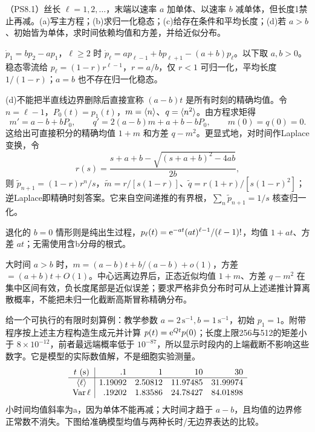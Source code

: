 \begin{exercise}
（PS8.1）丝长 $\ell=1,2,\ldots$，末端以速率 $a$ 加单体、以速率 $b$ 减单体，但长度1禁止再减。(a)写主方程；(b)求归一化稳态；(c)给存在条件和平均长度；(d)若 $a>b$、初始皆为单体，求时间依赖均值和方差，并给近似分布。
\end{exercise}
\begin{solution}
$\dot p_1=bp_2-ap_1$，$\ell\ge2$ 时 $\dot p_\ell=ap_{\ell-1}+bp_{\ell+1}-(a+b)p_\ell$。以下取 $a,b>0$。稳态零流给 $p_\ell=(1-r)r^{\ell-1}$，$r=a/b$，仅 $r<1$ 可归一化，平均长度 $1/(1-r)$；$a=b$ 也不存在归一化稳态。

(d)不能把半直线边界删除后直接宣称 $(a-b)t$ 是所有时刻的精确均值。令 $n=\ell-1$，$P_0(t)=p_1(t)$，$m=\langle n\rangle$、$q=\langle n^2\rangle$。由方程求矩得
\[
m'=a-b+bP_0,\qquad q'=2(a-b)m+a+b-bP_0,\qquad m(0)=q(0)=0.
\]
这给出可直接积分的精确均值 $1+m$ 和方差 $q-m^2$。更显式地，对时间作Laplace变换，令
\[
r(s)=\frac{s+a+b-\sqrt{(s+a+b)^2-4ab}}{2b},
\]
则 $\widetilde p_{n+1}=(1-r)r^n/s$，$\widetilde m=r/[s(1-r)]$、$\widetilde q=r(1+r)/[s(1-r)^2]$；逆Laplace即精确时刻答案。它来自空间递推的有界根，$\sum_n\widetilde p_{n+1}=1/s$ 核查归一化。

退化的 $b=0$ 情形则是纯出生过程，$p_{\ell}(t)=\mathrm e^{-at}(at)^{\ell-1}/(\ell-1)!$，均值 $1+at$、方差 $at$；无需使用含b分母的根式。

大时间 $a>b$ 时，$m=(a-b)t+b/(a-b)+o(1)$，方差 $=(a+b)t+O(1)$。中心远离边界后，正态近似均值 $1+m$、方差 $q-m^2$ 在集中区间有效，负长度尾部是近似误差；要求严格非负分布时可从上述递推计算离散概率，不能把未归一化截断高斯冒称精确分布。

给一个可执行的有限时刻算例：教学参数 $a=2\,\mathrm{s^{-1}},b=1\,\mathrm{s^{-1}}$，初始 $p_1=1$。附带程序按上述主方程构造生成元并计算 $p(t)=\mathrm e^{Qt}p(0)$；长度上限256与512的矩差小于 $8\times10^{-12}$，前者最远端概率低于 $10^{-87}$，所以显示时段内的上端截断不影响这些数字。它是模型的实际数值解，不是细胞实验测量。
\[
\begin{array}{c|rrrr}
t\ (\mathrm s)&.1&1&10&30\\\hline
\langle \ell\rangle&1.19092&2.50812&11.97485&31.99974\\
\operatorname{Var}\ell&.19202&1.83586&24.78427&84.01898
\end{array}
\]
小时间均值斜率为a，因为单体不能再减；大时间才趋于 $a-b$，且均值的边界修正常数不消失。下图给准确模型均值与两种长时/无边界表达的比较。
\begin{center}\end{center}


\end{solution}

